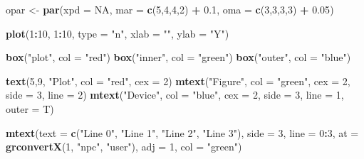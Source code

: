 \documentclass[]{book}
\newenvironment{Shaded}{\begin{snugshade}}{\end{snugshade}}
\newcommand{\KeywordTok}[1]{\textcolor[rgb]{0.13,0.29,0.53}{\textbf{#1}}}
\newcommand{\DataTypeTok}[1]{\textcolor[rgb]{0.13,0.29,0.53}{#1}}
\newcommand{\DecValTok}[1]{\textcolor[rgb]{0.00,0.00,0.81}{#1}}
\newcommand{\FloatTok}[1]{\textcolor[rgb]{0.00,0.00,0.81}{#1}}
\newcommand{\StringTok}[1]{\textcolor[rgb]{0.31,0.60,0.02}{#1}}
\newcommand{\OtherTok}[1]{\textcolor[rgb]{0.56,0.35,0.01}{#1}}
\newcommand{\OperatorTok}[1]{\textcolor[rgb]{0.81,0.36,0.00}{\textbf{#1}}}
\newcommand{\NormalTok}[1]{#1}
\begin{document}
\begin{Shaded}
\begin{Highlighting}[]
\NormalTok{opar <-}\StringTok{ }\KeywordTok{par}\NormalTok{(}\DataTypeTok{xpd =} \OtherTok{NA}\NormalTok{,}
    \DataTypeTok{mar =} \KeywordTok{c}\NormalTok{(}\DecValTok{5}\NormalTok{,}\DecValTok{4}\NormalTok{,}\DecValTok{4}\NormalTok{,}\DecValTok{2}\NormalTok{) }\OperatorTok{+}\StringTok{ }\FloatTok{0.1}\NormalTok{,}
    \DataTypeTok{oma =} \KeywordTok{c}\NormalTok{(}\DecValTok{3}\NormalTok{,}\DecValTok{3}\NormalTok{,}\DecValTok{3}\NormalTok{,}\DecValTok{3}\NormalTok{) }\OperatorTok{+}\StringTok{ }\FloatTok{0.05}\NormalTok{)}

\KeywordTok{plot}\NormalTok{(}\DecValTok{1}\OperatorTok{:}\DecValTok{10}\NormalTok{, }\DecValTok{1}\OperatorTok{:}\DecValTok{10}\NormalTok{, }\DataTypeTok{type =} \StringTok{"n"}\NormalTok{,}
     \DataTypeTok{xlab =} \StringTok{""}\NormalTok{, }\DataTypeTok{ylab =} \StringTok{"Y"}\NormalTok{)}

\KeywordTok{box}\NormalTok{(}\StringTok{"plot"}\NormalTok{, }\DataTypeTok{col =} \StringTok{"red"}\NormalTok{)}
\KeywordTok{box}\NormalTok{(}\StringTok{"inner"}\NormalTok{, }\DataTypeTok{col =} \StringTok{"green"}\NormalTok{)}
\KeywordTok{box}\NormalTok{(}\StringTok{"outer"}\NormalTok{, }\DataTypeTok{col =} \StringTok{"blue"}\NormalTok{)}

\KeywordTok{text}\NormalTok{(}\DecValTok{5}\NormalTok{,}\DecValTok{9}\NormalTok{, }\StringTok{"Plot"}\NormalTok{, }\DataTypeTok{col =} \StringTok{"red"}\NormalTok{, }\DataTypeTok{cex  =} \DecValTok{2}\NormalTok{)}
\KeywordTok{mtext}\NormalTok{(}\StringTok{"Figure"}\NormalTok{, }\DataTypeTok{col =} \StringTok{"green"}\NormalTok{, }\DataTypeTok{cex =} \DecValTok{2}\NormalTok{,}
      \DataTypeTok{side =} \DecValTok{3}\NormalTok{, }\DataTypeTok{line =} \DecValTok{2}\NormalTok{)}
\KeywordTok{mtext}\NormalTok{(}\StringTok{"Device"}\NormalTok{, }\DataTypeTok{col =} \StringTok{"blue"}\NormalTok{, }\DataTypeTok{cex =} \DecValTok{2}\NormalTok{,}
      \DataTypeTok{side =} \DecValTok{3}\NormalTok{, }\DataTypeTok{line =} \DecValTok{1}\NormalTok{, }\DataTypeTok{outer =}\NormalTok{ T)}

\KeywordTok{mtext}\NormalTok{(}\DataTypeTok{text =} \KeywordTok{c}\NormalTok{(}\StringTok{"Line 0"}\NormalTok{,}
               \StringTok{"Line 1"}\NormalTok{,}
               \StringTok{"Line 2"}\NormalTok{,}
               \StringTok{"Line 3"}\NormalTok{),}
      \DataTypeTok{side =} \DecValTok{3}\NormalTok{, }\DataTypeTok{line =} \DecValTok{0}\OperatorTok{:}\DecValTok{3}\NormalTok{,}
      \DataTypeTok{at =} \KeywordTok{grconvertX}\NormalTok{(}\DecValTok{1}\NormalTok{, }\StringTok{"npc"}\NormalTok{, }\StringTok{"user"}\NormalTok{),}
      \DataTypeTok{adj =} \DecValTok{1}\NormalTok{,}
      \DataTypeTok{col =} \StringTok{"green"}\NormalTok{)}


\end{Highlighting}
\end{Shaded}
\end{document}
